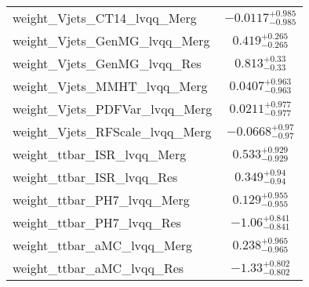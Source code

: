 \begin{tabular}{|l|c|}
weight\_Vjets\_CT14\_lvqq\_Merg & $-0.0117^{+0.985}_{-0.985}$ \\
weight\_Vjets\_GenMG\_lvqq\_Merg & $0.419^{+0.265}_{-0.265}$ \\
weight\_Vjets\_GenMG\_lvqq\_Res & $0.813^{+0.33}_{-0.33}$ \\
weight\_Vjets\_MMHT\_lvqq\_Merg & $0.0407^{+0.963}_{-0.963}$ \\
weight\_Vjets\_PDFVar\_lvqq\_Merg & $0.0211^{+0.977}_{-0.977}$ \\
weight\_Vjets\_RFScale\_lvqq\_Merg & $-0.0668^{+0.97}_{-0.97}$ \\
weight\_ttbar\_ISR\_lvqq\_Merg & $0.533^{+0.929}_{-0.929}$ \\
weight\_ttbar\_ISR\_lvqq\_Res & $0.349^{+0.94}_{-0.94}$ \\
weight\_ttbar\_PH7\_lvqq\_Merg & $0.129^{+0.955}_{-0.955}$ \\
weight\_ttbar\_PH7\_lvqq\_Res & $-1.06^{+0.841}_{-0.841}$ \\
weight\_ttbar\_aMC\_lvqq\_Merg & $0.238^{+0.965}_{-0.965}$ \\
weight\_ttbar\_aMC\_lvqq\_Res & $-1.33^{+0.802}_{-0.802}$ \\
\hline
\end{tabular}
